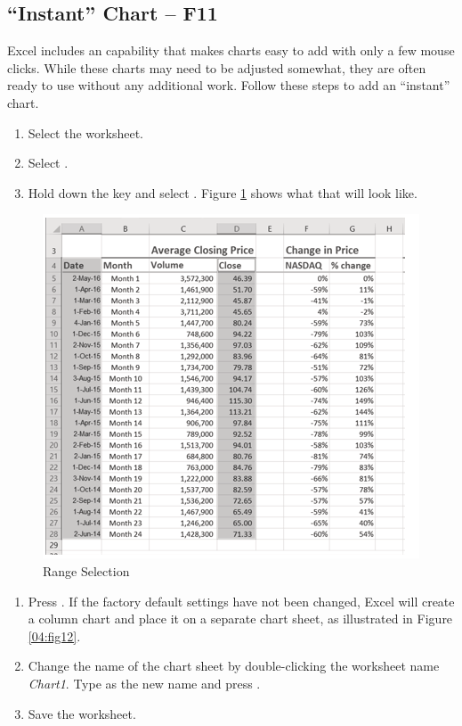 \subsection{``Instant'' Chart – F11}

Excel includes an  capability that makes charts easy to add with only a few mouse clicks. While these charts may need to be adjusted somewhat, they are often ready to use without any additional work. Follow these steps to add an ``instant'' chart.


\begin{enumerate}
	\item Select the  worksheet.
	\item Select .
	\item Hold down the  key and select . Figure \ref{04:fig11} shows what that will look like.
\end{enumerate}

\begin{figure}[H]
	\centering
	\includegraphics[width=\maxwidth{.95\linewidth}]{gfx/ch04_fig11}
	\caption{Range Selection}
	\label{04:fig11}
\end{figure}

\begin{enumerate}[resume]
	\item Press . If the factory default settings have not been changed, Excel will create a column chart and place it on a separate chart sheet, as illustrated in Figure \ref{04:fig12}.
	\item Change the name of the chart sheet by double-clicking the worksheet name \textit{Chart1}. Type  as the new name and press .
	\item Save the worksheet.
\end{enumerate}

